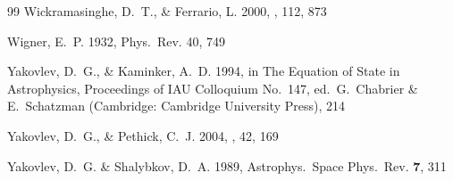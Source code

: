 \documentclass[traditabstract]{aa}
\begin{document}
\begin{thebibliography}{99}
Wickramasinghe, D.~T., \& Ferrario, L.
2000,
\pasp, 112, 873

Wigner, E.~P.
1932,
Phys.\ Rev. 40, 749

Yakovlev, D.~G., \& Kaminker, A.~D.
1994,
in The Equation of State in Astrophysics,
Proceedings of IAU Colloquium No.~147,
ed.\ G.~Chabrier \& E.~Schatzman
(Cambridge: Cambridge University Press), 214

Yakovlev, D.~G., \& Pethick, C.~J.
2004,
\araa, 42, 169

Yakovlev, D.~G. \& Shalybkov, D.~A.
1989,
Astrophys.\ Space Phys.\ Rev. \textbf{7}, 311

\end{thebibliography}
\end{document}
